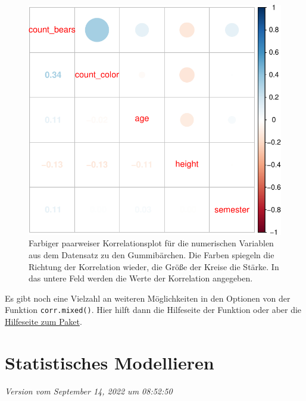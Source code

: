 \documentclass[
  letterpaper,
]{scrbook}
\begin{document}
\begin{figure}[H]

{\centering \includegraphics{./stat-linear-reg-corr_files/figure-pdf/fig-corrplot-mixed-01-1.pdf}

}

\caption{\label{fig-corrplot-mixed-01}Farbiger paarweiser
Korrelationsplot für die numerischen Variablen aus dem Datensatz zu den
Gummibärchen. Die Farben spiegeln die Richtung der Korrelation wieder,
die Größe der Kreise die Stärke. In das untere Feld werden die Werte der
Korrelation angegeben.}

\end{figure}

Es gibt noch eine Vielzahl an weiteren Möglichkeiten in den Optionen von
der Funktion \texttt{corr.mixed()}. Hier hilft dann die Hilfeseite der
Funktion oder aber die
\href{https://cran.r-project.org/web/packages/corrplot/vignettes/corrplot-intro.html}{Hilfeseite
zum Paket}.

\part{Statistisches Modellieren}

\emph{Version vom September 14, 2022 um 08:52:50}

{}
\end{document}
